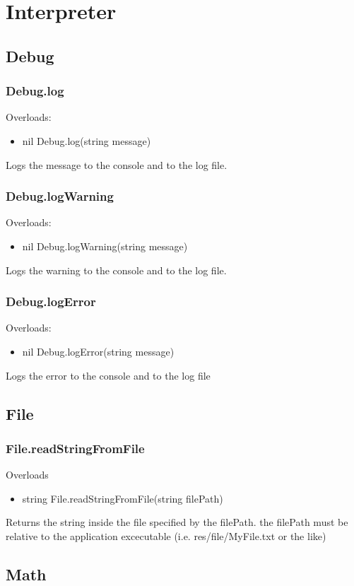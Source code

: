 \documentclass{book}
\newenvironment{ulist}
	{\begin{itemize}
			\itemsep0em}
	{\end{itemize}}
\begin{document}
\section{Interpreter}
\subsection{Debug}
\subsubsection{Debug.log}
Overloads:
\begin{ulist}
	\item nil Debug.log(string message)
\end{ulist}
Logs the message to the console and to the log file.

\subsubsection{Debug.logWarning}
Overloads:
\begin{ulist}
	\item nil Debug.logWarning(string message)
\end{ulist}
Logs the warning to the console and to the log file.

\subsubsection{Debug.logError}
Overloads:
\begin{ulist}
	\item nil Debug.logError(string message)
\end{ulist}
Logs the error to the console and to the log file


\subsection{File}
\subsubsection{File.readStringFromFile}
Overloads
\begin{ulist}
	\item string File.readStringFromFile(string filePath)
\end{ulist}
Returns the string inside the file specified by the filePath. the filePath must be relative to the application excecutable (i.e. res/file/MyFile.txt or the like)


\subsection{Math}
\end{document}
